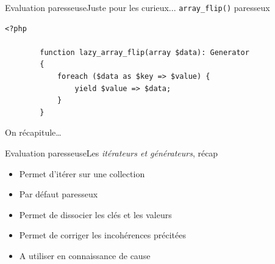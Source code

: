 \begin{frame}[fragile]{Evaluation paresseuse}{Juste pour les curieux... \texttt{array\_flip()} paresseux}
    \begin{lstlisting}[firstnumber=1]
        <?php

        function lazy_array_flip(array $data): Generator
        {
            foreach ($data as $key => $value) {
                yield $value => $data;
            }
        }
    \end{lstlisting}
\end{frame}

\begin{frameC}{On récapitule\ldots}

\end{frameC}

\begin{frame}{Evaluation paresseuse}{Les \textit{itérateurs et générateurs}, récap}
    \begin{itemize}[<+->]
        \item Permet d'itérer sur une collection

        \item Par défaut paresseux

        \item Permet de dissocier les clés et les valeurs

        \item Permet de corriger les incohérences précitées

        \item A utiliser en connaissance de cause
    \end{itemize}
\end{frame}

